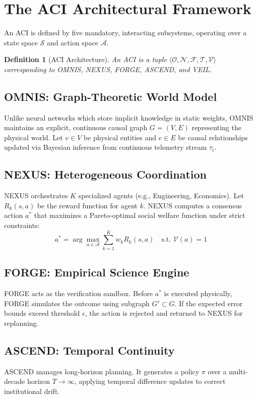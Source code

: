 \documentclass[11pt,twocolumn]{article}
\newtheorem{definition}{Definition}
\begin{document}
\section{The ACI Architectural Framework}
\label{sec:aci}
An ACI is defined by five mandatory, interacting subsystems, operating over a state space $\mathcal{S}$ and action space $\mathcal{A}$.

\begin{definition}[ACI Architecture]
An ACI is a tuple $\langle \mathcal{O}, \mathcal{N}, \mathcal{F}, \mathcal{T}, \mathcal{V} \rangle$ corresponding to OMNIS, NEXUS, FORGE, ASCEND, and VEIL.
\end{definition}

\subsection{OMNIS: Graph-Theoretic World Model}
Unlike neural networks which store implicit knowledge in static weights, OMNIS maintains an explicit, continuous causal graph $G = (V, E)$ representing the physical world. Let $v \in V$ be physical entities and $e \in E$ be causal relationships updated via Bayesian inference from continuous telemetry stream $\tau_t$.

\subsection{NEXUS: Heterogeneous Coordination}
NEXUS orchestrates $K$ specialized agents (e.g., Engineering, Economics). Let $R_k(s,a)$ be the reward function for agent $k$. NEXUS computes a consensus action $a^*$ that maximizes a Pareto-optimal social welfare function under strict constraints:
\begin{equation}
    a^* = \arg\max_{a \in \mathcal{A}} \sum_{k=1}^K w_k R_k(s,a) \quad \text{s.t. } \mathcal{V}(a) = 1
\end{equation}

\subsection{FORGE: Empirical Science Engine}
FORGE acts as the verification sandbox. Before $a^*$ is executed physically, FORGE simulates the outcome using subgraph $G' \subset G$. If the expected error bounds exceed threshold $\epsilon$, the action is rejected and returned to NEXUS for replanning.

\subsection{ASCEND: Temporal Continuity}
ASCEND manages long-horizon planning. It generates a policy $\pi$ over a multi-decade horizon $T \to \infty$, applying temporal difference updates to correct institutional drift.
\end{document}
